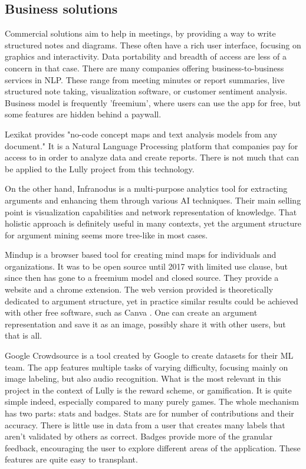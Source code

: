 \documentclass{report}
\begin{document}
\subsection{Business solutions}
Commercial solutions aim to help in meetings, by providing a way to write structured notes and diagrams. These often have a rich user interface, focusing on graphics and interactivity.
Data portability and breadth of access are less of a concern in that case.
There are many companies offering business-to-business services in NLP.  These range from meeting minutes or report summaries, live structured note taking, visualization software, or customer sentiment analysis.  Business model is frequently 'freemium', where users can use the app for free, but some features are hidden behind a paywall.

Lexikat \cite{noauthor_lexikat_nodate} provides "no-code concept maps and text analysis models from any document." It is a Natural Language Processing platform that companies pay for access to in order to analyze data and create reports. There is not much that can be applied to the Lully project from this technology.

On the other hand, Infranodus \cite{noauthor_infranodus_nodate} is a multi-purpose analytics tool for extracting arguments and enhancing them through various AI techniques. Their main selling point is visualization capabilities and network representation of knowledge. That holistic approach is definitely useful in many contexts, yet the argument structure for argument mining seems more tree-like in most cases.

Mindup \cite{noauthor_mindmup_nodate} is a browser based tool for creating mind maps for individuals and organizations. It was to be open source until 2017 with limited use clause, but since then has gone to a freemium model and closed source. They provide a website and a chrome extension. The web version provided is theoretically dedicated to argument structure, yet in practice similar results could be achieved with other free software, such as Canva \cite{noauthor_home_nodate}. One can create an argument representation and save it as an image, possibly share it with other users, but that is all.

Google Crowdsource \cite{noauthor_crowdsource_2023} is a tool created by Google to create datasets for their ML team. The app features multiple tasks of varying difficulty, focusing mainly on image labeling, but also audio recognition. What is the most relevant in this project in the context of Lully is the reward scheme, or gamification. It is quite simple indeed, especially compared to many purely games. The whole mechanism has two parts: stats and badges. Stats are for number of contributions and their accuracy. There is little use in data from a user that creates many labels that aren't validated by others as correct. Badges provide more of the granular feedback, encouraging the user to explore different areas of the application. These features are quite easy to transplant.
\end{document}
